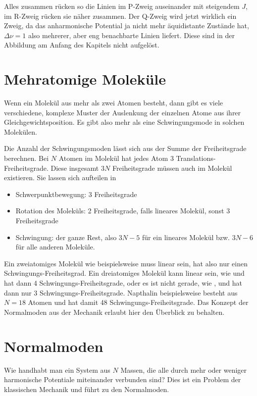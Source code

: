 Alles zusammen rücken so die Linien im P-Zweig auseinander mit steigendem $J$, im R-Zweig rücken sie näher zusammen. Der Q-Zweig wird jetzt wirklich ein Zweig, da das anharmonische Potential ja nicht mehr äquidistante Zustände hat, $\Delta \nu = 1$ also mehrerer, aber eng benachbarte Linien liefert. Diese sind in der Abbildung am Anfang des Kapitels nicht aufgelöst.


\section{Mehratomige Moleküle}

Wenn ein Molekül aus mehr als zwei Atomen besteht, dann gibt es viele verschiedene, komplexe Muster der Auslenkung der einzelnen Atome aus ihrer Gleichgewichtsposition. Es gibt also mehr als eine Schwingungsmode in solchen Molekülen.

Die Anzahl der Schwingungsmoden lässt sich aus der Summe der Freiheitsgrade berechnen. Bei $N$ Atomen im Molekül hat jedes Atom $3$ Translations-Freiheitsgrade. Diese insgesamt $3N$ Freiheitsgrade müssen auch im Molekül existieren. Sie lassen sich aufteilen in
\begin{itemize} \setlength{\itemsep}{0pt}
\item Schwerpunktbewegung: 3 Freiheitsgrade
\item Rotation des Moleküls: 2 Freiheitsgrade, falls lineares Molekül, sonst 3 Freiheitsgrade
\item Schwingung: der ganze Rest, also $3N-5$ für ein lineares Molekül bzw. $3N-6$ für alle anderen Moleküle. 
\end{itemize}

Ein zweiatomiges Molekül wie beispielsweise  muss linear sein, hat also nur einen Schwingungs-Freiheitsgrad. Ein dreiatomiges Molekül kann linear sein, wie  und hat dann 4  Schwingungs-Freiheitsgrade, oder es ist nicht gerade, wie , und hat dann nur 3  Schwingungs-Freiheitsgrade. Napthalin beispielsweise besteht aus $N=18$ Atomen und hat damit  48 Schwingungs-Freiheitsgrade. Das Konzept der Normalmoden aus der Mechanik erlaubt hier den Überblick zu behalten.


\section{Normalmoden}

Wie handhabt man ein System aus $N$ Massen, die alle durch mehr oder weniger harmonische Potentiale miteinander verbunden sind? Dies ist ein Problem der klassischen Mechanik und führt zu den Normalmoden.

